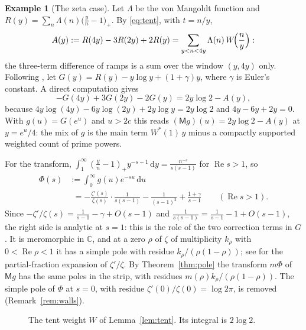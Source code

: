 \documentclass[11pt]{amsart}
\theoremstyle{definition}
\newtheorem{example}[theorem]{Example}
\theoremstyle{remark}
\DeclareMathOperator{\re}{Re}
\newcommand{\C}{\mathbb{C}}
\newcommand{\M}{\mathsf{M}}
\newcommand{\dd}{\,\mathrm{d}}
\begin{document}
\begin{example}[The zeta case]\label{ex:zeta}
Let $\Lambda$ be the von Mangoldt function and $R(y)=\sum_{n}\Lambda(n)\bigl(\tfrac yn-1\bigr)_+$.
By \eqref{eq:tent}, with $t=n/y$,
\[
A(y):=R(4y)-3R(2y)+2R(y)=\sum_{y<n<4y}\Lambda(n)\,W\!\Bigl(\frac ny\Bigr):
\]
the three-term difference of ramps is a sum over the window $(y,4y)$ only. Following
\cite{Crossley-transfer}, let $G(y)=R(y)-y\log y+(1+\gamma)y$, where $\gamma$ is Euler's constant.
A direct computation gives
\[
-G(4y)+3G(2y)-2G(y)=2y\log 2-A(y),
\]
because $4y\log(4y)-6y\log(2y)+2y\log y=2y\log2$ and $4y-6y+2y=0$. With $g(u)=G(e^u)$ and
$u>2c$ this reads $(\M g)(u)=2y\log2-A(y)$ at $y=e^u/4$: the mix of $g$ is the main term
$W^*(1)\,y$ minus a compactly supported weighted count of prime powers.

For the transform, $\int_1^\infty(\tfrac yn-1)_+y^{-s-1}\dd y=\tfrac{n^{-s}}{s(s-1)}$ for
$\re s>1$, so
\begin{align*}
\Phi(s)&:=\int_0^\infty g(u)e^{-su}\dd u\\
&\phantom{:}=-\frac{\zeta'(s)}{\zeta(s)}\cdot\frac{1}{s(s-1)}-\frac{1}{(s-1)^2}+\frac{1+\gamma}{s-1}
\qquad(\re s>1).
\end{align*}
Since $-\zeta'/\zeta(s)=\tfrac1{s-1}-\gamma+O(s-1)$ and $\tfrac1{s(s-1)}=\tfrac1{s-1}-1+O(s-1)$,
the right side is analytic at $s=1$: this is the role of the two correction terms in $G$. It is
meromorphic in $\C$, and at a zero $\rho$ of $\zeta$ of multiplicity $k_\rho$ with $0<\re\rho<1$
it has a simple pole with residue $k_\rho/(\rho(1-\rho))$; see \cite[\S12]{Davenport} for the
partial-fraction expansion of $\zeta'/\zeta$. By Theorem~\ref{thm:pole} the transform
$m\Phi$ of $\M g$ has the same poles in the strip, with residues $m(\rho)k_\rho/(\rho(1-\rho))$.
The simple pole of $\Phi$ at $s=0$, with residue $\zeta'(0)/\zeta(0)=\log 2\pi$, is removed
(Remark~\ref{rem:walls}).
\end{example}

\begin{figure}[t]
\centering
{}
\caption{The tent weight $W$ of Lemma~\ref{lem:tent}. Its integral is $2\log 2$.}
\label{fig:tent}
\end{figure}
\end{document}
